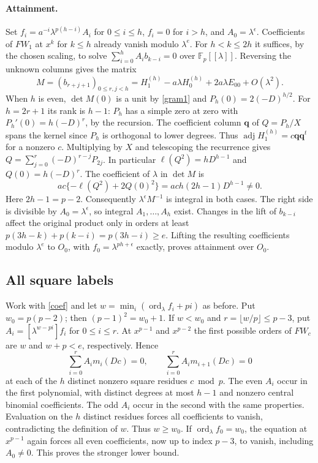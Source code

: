 \documentclass[11pt]{article}
\begin{document}
\paragraph{Attainment.}
Set $f_i=a^{-i}\lambda^{p(h-i)}A_i$ for $0\le i\le h$,
$f_i=0$ for $i>h$, and $A_0=\lambda^\epsilon$. Coefficients of
$FW_1$ at $x^k$ for $k\le h$ already vanish modulo $\lambda^e$.
For $h<k\le2h$ it suffices, by the chosen scaling, to solve
$\sum_{i=0}^h A_i b_{k-i}=0$ over $\mathbb F_p[[\lambda]]$.
Reversing the unknown columns gives the matrix
\[
 M=(b_{r+j+1})_{0\le r,j<h}
 =H_1^{(h)}-a\lambda H_0^{(h)}
       +2a\lambda E_{00}+O(\lambda^2).
\]
When $h$ is even, $\det M(0)$ is a unit by \eqref{gram1} and
$P_h(0)=2(-D)^{h/2}$. For $h=2r+1$ its rank is $h-1$: $P_h$
has a simple zero at zero with $P_h'(0)=h(-D)^r$, by the recursion.
The coefficient column $\mathbf q$ of $Q=P_h/X$ spans the kernel
since $P_h$ is orthogonal to lower degrees. Thus
$\operatorname{adj} H_1^{(h)}=c\mathbf q\mathbf q^t$ for a nonzero
$c$. Multiplying by $X$ and telescoping the recurrence gives
$Q=\sum_{j=0}^r(-D)^{r-j}P_{2j}$. In particular
$\ell(Q^2)=hD^{h-1}$ and $Q(0)=h(-D)^r$. The coefficient of $\lambda$
in $\det M$ is
\[
 ac\{-\ell(Q^2)+2Q(0)^2\}=ac h(2h-1)D^{h-1}\ne0 .
\]
Here $2h-1=p-2$. Consequently $\lambda^\epsilon M^{-1}$ is integral
in both cases. The right side is divisible by $A_0=\lambda^\epsilon$,
so integral $A_1,\ldots,A_h$ exist. Changes in the lift of $b_{k-i}$
affect the original product only in orders at least
$p(3h-k)+p(k-i)=p(3h-i)\ge e$. Lifting the resulting coefficients
modulo $\lambda^e$ to $O_0$, with $f_0=\lambda^{ph+\epsilon}$
exactly, proves attainment over $O_0$.

\subsection{All square labels}
Work with \eqref{coef} and let $w=\min_i(\operatorname{ord}_{\lambda} f_i+pi)$ as before.
Put $w_0=p(p-2)$; then $(p-1)^2=w_0+1$. If $w<w_0$ and
$r=\lfloor w/p\rfloor\le p-3$, put $A_i=[\lambda^{w-pi}]f_i$
for $0\le i\le r$. At $x^{p-1}$ and $x^{p-2}$ the first possible
orders of $FW_c$ are $w$ and $w+p<e$, respectively. Hence
\[
 \sum_{i=0}^r A_i m_i(Dc)=0,\qquad
 \sum_{i=0}^r A_i m_{i+1}(Dc)=0
\]
at each of the $h$ distinct nonzero square residues $c\bmod p$.
The even $A_i$ occur in the first polynomial, with distinct degrees
at most $h-1$ and nonzero central binomial coefficients. The odd
$A_i$ occur in the second with the same properties. Evaluation on
the $h$ distinct residues forces all coefficients to vanish,
contradicting the definition of $w$. Thus $w\ge w_0$. If
$\operatorname{ord}_{\lambda} f_0=w_0$, the equation at $x^{p-1}$ again forces all even
coefficients, now up to index $p-3$, to vanish, including
$A_0\ne0$. This proves the stronger lower bound.
\end{document}
